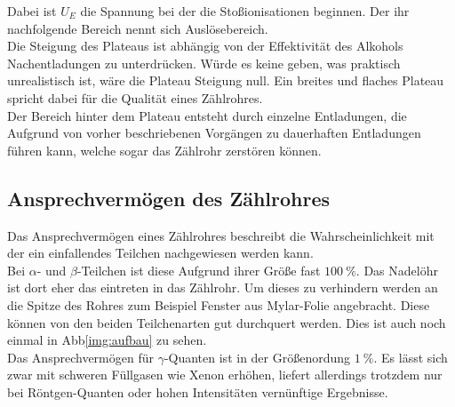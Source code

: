 \noindent
Dabei ist $U_E$ die Spannung bei der die Stoßionisationen beginnen. Der ihr nachfolgende Bereich nennt sich Auslösebereich.\\
Die Steigung des Plateaus ist abhängig von der Effektivität des Alkohols Nachentladungen zu unterdrücken. Würde es keine geben, was praktisch unrealistisch ist, wäre die Plateau Steigung null.
Ein breites und flaches Plateau spricht dabei für die Qualität eines Zählrohres.\\
Der Bereich hinter dem Plateau entsteht durch einzelne Entladungen, die Aufgrund von vorher beschriebenen Vorgängen zu dauerhaften Entladungen führen kann, welche sogar das Zählrohr zerstören können.\\

\subsection{Ansprechvermögen des Zählrohres}

\noindent
Das Ansprechvermögen eines Zählrohres beschreibt die Wahrscheinlichkeit mit der ein einfallendes Teilchen nachgewiesen werden kann.\\
Bei $\alpha$- und $\beta$-Teilchen ist diese Aufgrund ihrer Größe fast $\SI{100}{\percent}$. Das Nadelöhr ist dort eher das eintreten in das Zählrohr. 
Um dieses zu verhindern werden an die Spitze des Rohres zum Beispiel Fenster aus Mylar-Folie angebracht. Diese können von den beiden Teilchenarten gut durchquert werden.
Dies ist auch noch einmal in Abb\ref{img:aufbau} zu sehen.\\
Das Ansprechvermögen für $\gamma$-Quanten ist in der Größenordung $\SI{1}{\percent}$. Es lässt sich zwar mit schweren Füllgasen wie Xenon erhöhen, liefert allerdings trotzdem nur bei Röntgen-Quanten
oder hohen Intensitäten vernünftige Ergebnisse.

